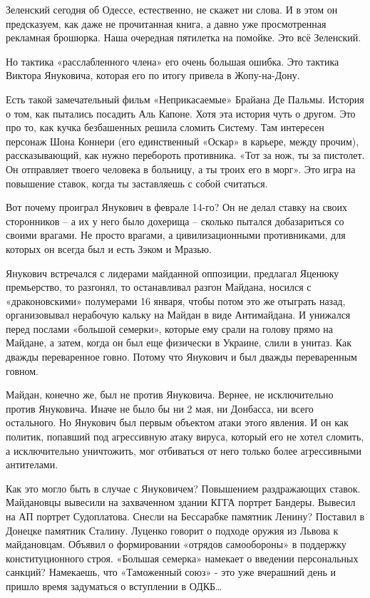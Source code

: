 Зеленский сегодня об Одессе, естественно, не скажет ни слова. И в этом он
предсказуем, как даже не прочитанная книга, а давно уже просмотренная рекламная
брошюрка. Наша очередная пятилетка на помойке. Это всё Зеленский.

Но тактика «расслабленного члена» его очень большая ошибка. Это тактика Виктора
Януковича, которая его по итогу привела в Жопу-на-Дону.

Есть такой замечательный фильм «Неприкасаемые» Брайана Де Пальмы. История о
том, как пытались посадить Аль Капоне. Хотя эта история чуть о другом. Это про
то, как кучка безбашенных решила сломить Систему. Там интересен персонаж Шона
Коннери (его единственный «Оскар» в карьере, между прочим), рассказывающий, как
нужно перебороть противника. «Тот за нож, ты за пистолет. Он отправляет твоего
человека в больницу, а ты троих его в морг». Это игра на повышение ставок,
когда ты заставляешь с собой считаться.

Вот почему проиграл Янукович в феврале 14-го? Он не делал ставку на своих
сторонников – а их у него было дохерища – сколько пытался добазариться со
своими врагами. Не просто врагами, а цивилизационными противниками, для которых
он всегда был и есть Зэком и Мразью.

Янукович встречался с лидерами майданной оппозиции, предлагал Яценюку
премьерство, то разгонял, то останавливал разгон Майдана, носился с
«драконовскими» полумерами 16 января, чтобы потом это же отыграть назад,
организовывал нерабочую кальку на Майдан в виде Антимайдана. И унижался перед
послами «большой семерки», которые ему срали на голову прямо на Майдане, а
затем, когда он был еще физически в Украине, слили в унитаз. Как дважды
переваренное говно. Потому что Янукович и был дважды переваренным говном.

Майдан, конечно же, был не против Януковича. Вернее, не исключительно против
Януковича. Иначе не было бы ни 2 мая, ни Донбасса, ни всего остального. Но
Янукович был первым объектом атаки этого явления. И он как политик, попавший
под агрессивную атаку вируса, который его не хотел сломить, а исключительно
уничтожить, мог отбиваться от него только более агрессивными антителами.

Как это могло быть в случае с Януковичем? Повышением раздражающих ставок.
Майдановцы вывесили на захваченном здании КГГА портрет Бандеры. Вывесил на АП
портрет Судоплатова. Снесли на Бессарабке памятник Ленину? Поставил в Донецке
памятник Сталину. Луценко говорит о подходе оружия из Львова к майдановцам.
Объявил о формировании «отрядов самообороны» в поддержку конституционного
строя. «Большая семерка» намекает о введении персональных санкций? Намекаешь,
что «Таможенный союз» - это уже вчерашний день и пришло время задуматься о
вступлении в ОДКБ…

